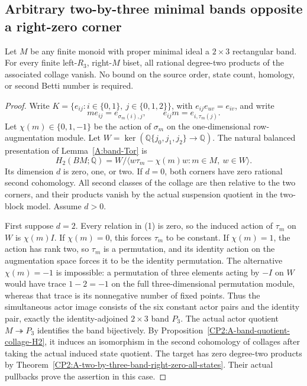 \subsection{Arbitrary two-by-three minimal bands opposite a right-zero corner}

\begin{theorem}
\label{CP2:A-two-by-three-band-general-right-zero}
Let $M$ be any finite monoid with proper minimal ideal a
$2\times3$ rectangular band.  For every finite left-$R_3$,
right-$M$ biset, all rational degree-two products of the
associated collage vanish.  No bound on the source order,
state count, homology, or second Betti number is required.
\end{theorem}
\begin{proof}
Write $K=\{e_{ij}:i\in\{0,1\},\ j\in\{0,1,2\}\}$,
with $e_{ij}e_{uv}=e_{iv}$, and write
\[
 me_{ij}=e_{\sigma_m(i),j},\qquad
 e_{ij}m=e_{i,\tau_m(j)}.
\]
Let $\chi(m)\in\{0,1,-1\}$ be the action of $\sigma_m$
on the one-dimensional row-augmentation module.
Let $W=\ker(\mathbb Q\{j_0,j_1,j_2\}\to\mathbb Q)$.
The natural balanced presentation of Lemma~\ref{A:band-Tor}
is
\[
 H_2(BM;\mathbb Q)
   =W/\langle w\tau_m-\chi(m)w:m\in M,\ w\in W\rangle.
                                                               \tag{1}
\]
Its dimension $d$ is zero, one, or two.
If $d=0$, both corners have zero rational second cohomology.
All second classes of the collage are then relative to the
two corners, and their products vanish by the actual
suspension quotient in the two-block model.
Assume $d>0$.

First suppose $d=2$.  Every relation in (1) is zero, so
the induced action of $\tau_m$ on $W$ is $\chi(m)I$.
If $\chi(m)=0$, this forces $\tau_m$ to be constant.
If $\chi(m)=1$, the action has rank two, so $\tau_m$
is a permutation, and its identity action on the augmentation
space forces it to be the identity permutation.
The alternative $\chi(m)=-1$ is impossible: a permutation
of three elements acting by $-I$ on $W$ would have trace
$1-2=-1$ on the full three-dimensional permutation module,
whereas that trace is its nonnegative number of fixed points.
Thus the simultaneous actor image consists of the six
constant actor pairs and the identity pair, exactly the
identity-adjoined $2\times3$ band $P_3$.
The actual actor quotient $M\twoheadrightarrow P_3$
identifies the band bijectively.  By
Proposition~\ref{CP2:A-band-quotient-collage-H2}, it induces
an isomorphism in the second cohomology of collages after
taking the actual induced state quotient.  The target has
zero degree-two products by
Theorem~\ref{CP2:A-two-by-three-band-right-zero-all-states}.
Their actual pullbacks prove the assertion in this case.


\end{proof}
